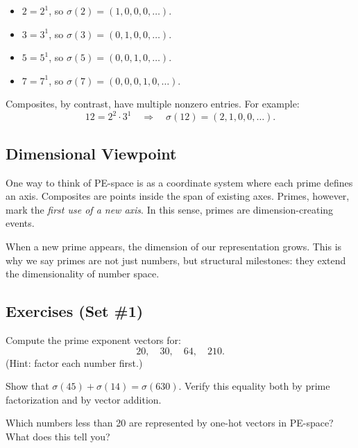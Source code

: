 \documentclass[11pt]{article}
\theoremstyle{definition}
\begin{document}
\begin{studentexample}
\begin{itemize}
  \item $2 = 2^1$, so $\sigma(2) = (1,0,0,0,\dots)$.
  \item $3 = 3^1$, so $\sigma(3) = (0,1,0,0,\dots)$.
  \item $5 = 5^1$, so $\sigma(5) = (0,0,1,0,\dots)$.
  \item $7 = 7^1$, so $\sigma(7) = (0,0,0,1,0,\dots)$.
\end{itemize}
\end{studentexample}

Composites, by contrast, have multiple nonzero entries.  
For example:
\[
12 = 2^2 \cdot 3^1 \quad \Rightarrow \quad \sigma(12) = (2,1,0,0,\dots).
\]

\subsection{Dimensional Viewpoint}
One way to think of PE-space is as a coordinate system where each prime defines an axis.  
Composites are points inside the span of existing axes.  
Primes, however, mark the \emph{first use of a new axis}.  
In this sense, primes are dimension-creating events.

\begin{studentnote}
When a new prime appears, the dimension of our representation grows. 
This is why we say primes are not just numbers, but structural milestones: 
they extend the dimensionality of number space. 
\end{studentnote}

\subsection*{Exercises (Set \#1)}
\begin{studentexercise}
Compute the prime exponent vectors for:
\[
20, \quad 30, \quad 64, \quad 210.
\]
(Hint: factor each number first.)
\end{studentexercise}

\begin{studentexercise}
Show that $\sigma(45) + \sigma(14) = \sigma(630)$. 
Verify this equality both by prime factorization and by vector addition.
\end{studentexercise}

\begin{studentexercise}
Which numbers less than 20 are represented by one-hot vectors in PE-space? 
What does this tell you?
\end{studentexercise}
\end{document}
